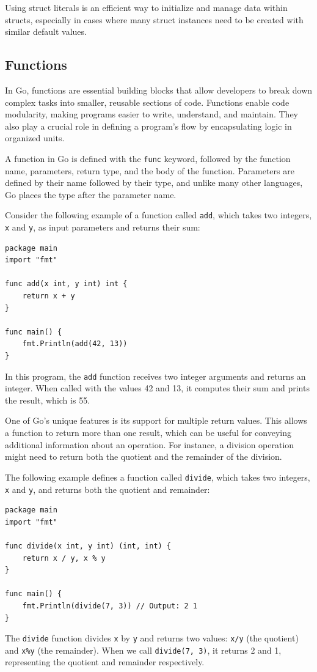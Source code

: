 Using struct literals is an efficient way to initialize and manage data within structs, especially in cases where many struct instances need to be created with similar default values.

\subsection*{Functions}
In Go, functions are essential building blocks that allow developers to break down complex tasks into smaller, reusable sections of code. Functions enable code modularity, making programs easier to write, understand, and maintain. They also play a crucial role in defining a program’s flow by encapsulating logic in organized units.

A function in Go is defined with the \texttt{func} keyword, followed by the function name, parameters, return type, and the body of the function. Parameters are defined by their name followed by their type, and unlike many other languages, Go places the type after the parameter name.

Consider the following example of a function called \texttt{add}, which takes two integers, \texttt{x} and \texttt{y}, as input parameters and returns their sum:

\begin{verbatim}
package main
import "fmt"

func add(x int, y int) int {
    return x + y
}

func main() {
    fmt.Println(add(42, 13))
}
\end{verbatim}
In this program, the \texttt{add} function receives two integer arguments and returns an integer. When called with the values 42 and 13, it computes their sum and prints the result, which is 55.

One of Go’s unique features is its support for multiple return values. This allows a function to return more than one result, which can be useful for conveying additional information about an operation. For instance, a division operation might need to return both the quotient and the remainder of the division.

The following example defines a function called \texttt{divide}, which takes two integers, \texttt{x} and \texttt{y}, and returns both the quotient and remainder:

\begin{verbatim}
package main
import "fmt"

func divide(x int, y int) (int, int) {
    return x / y, x % y
}

func main() {
    fmt.Println(divide(7, 3)) // Output: 2 1
}
\end{verbatim}
The \texttt{divide} function divides \texttt{x} by \texttt{y} and returns two values: \texttt{x/y} (the quotient) and \texttt{x\%y} (the remainder). When we call \texttt{divide(7, 3)}, it returns 2 and 1, representing the quotient and remainder respectively.

